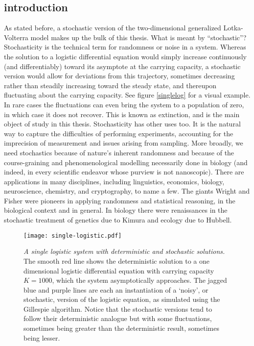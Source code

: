 \subsection{introduction}
As stated before, a stochastic version of the two-dimensional generalized Lotka-Volterra model makes up the bulk of this thesis. 
What is meant by ``stochastic''? 
Stochasticity is the technical term for randomness or noise in a system. 
Whereas the solution to a logistic differential equation would simply increase continuously (and differentiably) toward its asymptote at the carrying capacity, a stochastic version would allow for deviations from this trajectory, sometimes decreasing rather than steadily increasing toward the steady state, and thereupon fluctuating about the carrying capacity. 
See figure \ref{singlelog} for a visual example. 
In rare cases the fluctuations can even bring the system to a population of zero, in which case it does not recover. 
This is known as extinction, and is the main object of study in this thesis. 
Stochasticity has other uses too. 
It is the natural way to capture the difficulties of performing experiments, accounting for the imprecision of measurement and issues arising from sampling. 
More broadly, we need stochastics because of nature's inherent randomness and because of the course-graining and phenomenological modelling necessarily done in biology (and indeed, in every scientific endeavor whose purview is not nanoscopic). %
There are applications in many disciplines, including linguistics, economics, biology, neuroscience, chemistry, and cryptography, to name a few. 
The giants Wright and Fisher were pioneers in applying randomness and statistical reasoning, in the biological context and in general. 
In biology there were renaissances in the stochastic treatment of genetics due to Kimura and ecology due to Hubbell. 
\begin{figure}%
	\centering
	\texttt{[image: single-logistic.pdf]}
	\caption{\emph{A single logistic system with deterministic and stochastic solutions.} The smooth red line shows the deterministic solution to a one dimensional logistic differential equation with carrying capacity $K=1000$, which the system asymptotically approaches. The jagged blue and purple lines are each an instantiation of a `noisy', or stochastic, version of the logistic equation, as simulated using the Gillespie algorithm. Notice that the stochastic versions tend to follow their deterministic analogue but with some fluctuations, sometimes being greater than the deterministic result, sometimes being lesser. }
\end{figure} \label{singlelog}

